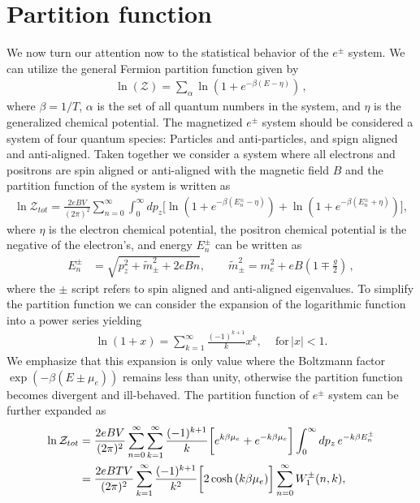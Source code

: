 \documentclass[Universe,article,submit,moreauthors,pdftex]{Definitions/mdpi}
\begin{document}
\section{Partition function}
\noindent We now turn our attention now to the statistical behavior of the $e^{\pm}$ system. We can utilize the general Fermion partition function given by
\begin{align}
  \label{PartFunc} \ln(\mathcal{Z})=\sum_{\alpha}\ln\left(1+e^{-\beta(E-\eta)}\right)\,,
\end{align}
where $\beta=1/T$, $\alpha$ is the set of all quantum numbers in the system, and $\eta$ is the generalized chemical potential. The magnetized $e^{\pm}$ system should be considered a system of four quantum species: Particles and anti-particles, and spign aligned and anti-aligned. Taken together we consider a system where all electrons and positrons are spin aligned or anti-aligned with the magnetic field $B$ and the partition function of the system is written as
\begin{align}
\ln\mathcal{Z}_{tot}=\frac{2eBV}{(2\pi)^2}\sum_{n=0}^\infty\int^\infty_{0} \!\!dp_z\bigg[\ln\left(1+e^{-\beta(E_{n}^\pm-\eta)}\right)+\ln\left(1+e^{-\beta(E_{n}^\pm+\eta)}\right)\bigg],
\end{align}
where $\eta$ is the electron chemical potential, the positron chemical potential is the negative of the electron's, and energy $E_{n}^\pm$ can be written as
\begin{align}
E_{n}^\pm&=\sqrt{p^2_z+\tilde m^2_\pm+2eBn},\qquad\tilde{m}^2_\pm=m^2_e+eB\left(1\mp\frac{g}{2}\right)\,,
\end{align}
where the $\pm$ script refers to spin aligned and anti-aligned eigenvalues. To simplify the partition function we can consider the expansion of the logarithmic function into a power series yielding
\begin{align}
\ln\left(1+x\right)=\sum^{\infty}_{k=1}\frac{(-1)^{k+1}}{k}x^k, \,\,\,\,\,\,\,\mathrm{for}\,|x|<1.
\end{align}
We emphasize that this expansion is only value where the Boltzmann factor $\exp\left(-\beta(E\pm\mu_{e})\right)$ remains less than unity, otherwise the partition function becomes divergent and ill-behaved. The partition function of $e^{\pm}$ system can be further expanded as
\begin{align}
\ln\mathcal{Z}_{tot}
&=\frac{2eBV}{(2\pi)^2}\sum_{n=0}^\infty\sum^{\infty}_{k=1}\frac{(-1)^{k+1}}{k}\bigg[e^{k\beta\mu_e}+e^{-k\beta\mu_e}\bigg]\int_0^\infty dp_z\,e^{-k\beta E_n^\pm}\notag\\
&=\frac{2eBTV}{(2\pi)^2}\sum^{\infty}_{k=1}\frac{(-1)^{k+1}}{k^2}\bigg[2\cosh{(k\beta\mu_e)}\bigg]\sum_{n=0}^\infty W^\pm_1(n,k),
\end{align}
\end{document}
